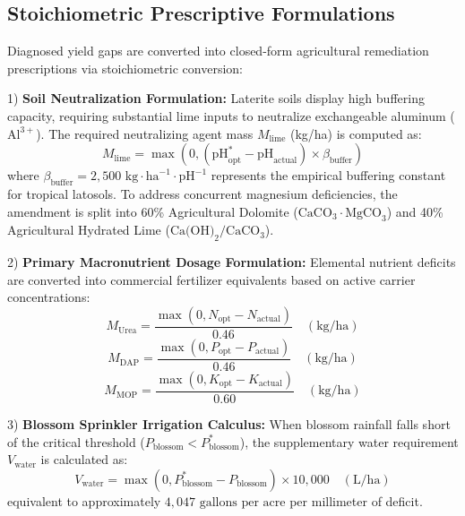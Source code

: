 \documentclass[conference]{IEEEtran}
\begin{document}
\subsection{Stoichiometric Prescriptive Formulations}
Diagnosed yield gaps are converted into closed-form agricultural remediation prescriptions via stoichiometric conversion:

1) \textbf{Soil Neutralization Formulation:}
Laterite soils display high buffering capacity, requiring substantial lime inputs to neutralize exchangeable aluminum ($\text{Al}^{3+}$). The required neutralizing agent mass $M_{\text{lime}}$ (kg/ha) is computed as:
\begin{equation}
M_{\text{lime}} = \max\left(0, (\text{pH}_{\text{opt}}^* - \text{pH}_{\text{actual}}) \times \beta_{\text{buffer}}\right)
\end{equation}
where $\beta_{\text{buffer}} = 2,500\text{ kg}\cdot\text{ha}^{-1}\cdot\text{pH}^{-1}$ represents the empirical buffering constant for tropical latosols. To address concurrent magnesium deficiencies, the amendment is split into 60\% Agricultural Dolomite ($\text{CaCO}_3 \cdot \text{MgCO}_3$) and 40\% Agricultural Hydrated Lime ($\text{Ca(OH)}_2 / \text{CaCO}_3$).

2) \textbf{Primary Macronutrient Dosage Formulation:}
Elemental nutrient deficits are converted into commercial fertilizer equivalents based on active carrier concentrations:
\begin{equation}
M_{\text{Urea}} = \frac{\max\left(0, N_{\text{opt}} - N_{\text{actual}}\right)}{0.46} \quad (\text{kg/ha})
\end{equation}
\begin{equation}
M_{\text{DAP}} = \frac{\max\left(0, P_{\text{opt}} - P_{\text{actual}}\right)}{0.46} \quad (\text{kg/ha})
\end{equation}
\begin{equation}
M_{\text{MOP}} = \frac{\max\left(0, K_{\text{opt}} - K_{\text{actual}}\right)}{0.60} \quad (\text{kg/ha})
\end{equation}

3) \textbf{Blossom Sprinkler Irrigation Calculus:}
When blossom rainfall falls short of the critical threshold ($P_{\text{blossom}} < P_{\text{blossom}}^*$), the supplementary water requirement $V_{\text{water}}$ is calculated as:
\begin{equation}
V_{\text{water}} = \max\left(0, P_{\text{blossom}}^* - P_{\text{blossom}}\right) \times 10,000 \quad (\text{L/ha})
\end{equation}
equivalent to approximately $4,047\text{ gallons per acre}$ per millimeter of deficit.
\end{document}
